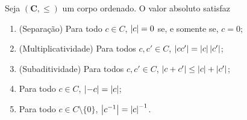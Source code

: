 \begin{proposition}
Seja $(\bm C,\leq)$ um corpo ordenado. O valor absoluto satisfaz
	\begin{enumerate}
	\item (Separação) Para todo $c \in C$, $\left\vert{c}\right\vert=0$ se, e somente se, $c=0$;
	\item (Multiplicatividade) Para todos $c,c' \in C$, $\left\vert{cc'}\right\vert=\left\vert{c}\right\vert\left\vert{c'}\right\vert$;
	\item (Subaditividade) Para todos $c,c' \in C$, $\left\vert{c+c'}\right\vert \leq \left\vert{c}\right\vert + \left\vert{c'}\right\vert$;
	
	\item Para todo $c \in C$, $\left\vert{-c}\right\vert = \left\vert{c}\right\vert$;
	\item Para todo $c \in C \setminus \{0\}$, $\left\vert{c^{-1}}\right\vert = \left\vert{c}\right\vert^{-1}$.
	\end{enumerate}
\end{proposition}
